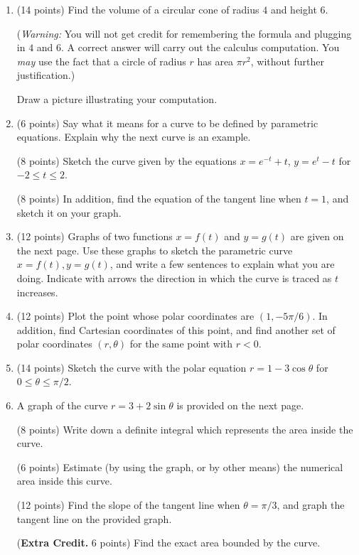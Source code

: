 \documentclass[12pt]{article}
\begin{document}
\begin{enumerate}[(1)]
\item
(14 points) Find the volume of a circular cone of radius $4$ and height $6$.

({\itshape Warning:} You will not get credit for remembering the formula
and plugging in $4$ and $6$. A correct answer will carry out the calculus
computation. You {\itshape may} use the fact that a circle of radius $r$ has
area $\pi r^2$, without further justification.)

Draw a picture illustrating your computation.

\item
(6 points) Say what it means for a curve to be defined by parametric equations. Explain why the next curve
is an example.

(8 points) Sketch the curve given by the equations $x = e^{-t} + t$, $y = e^t - t$ for $-2 \leq t \leq 2$.

(8 points) In addition, find the equation of the tangent line when $t = 1$, and sketch it on your graph.

\item
(12 points) Graphs of two functions $x = f(t)$ and $y = g(t)$ are given on the next page. Use these graphs to sketch
the parametric curve $x = f(t), y = g(t)$, and write a few sentences to explain what you
are doing. 
Indicate with arrows
the direction in which the curve is traced as $t$ increases.
\item
(12 points) Plot the point whose polar coordinates are $(1, -5 \pi/6)$. In addition, find Cartesian
coordinates of this point, and find another set of polar coordinates $(r, \theta)$ for the
same point with $r < 0$.
\item
(14 points) Sketch the curve with the polar equation $r = 1 - 3 \cos \theta$ for $0 \leq \theta \leq \pi/2$.

\item
A graph of the curve $r = 3 + 2 \sin \theta$ is provided on the next page.

(8 points) Write down a definite integral which represents the area inside the curve. 

(6 points) Estimate (by using the graph, or by other means) the numerical area inside this curve.

(12 points) Find the slope of the tangent line when $\theta = \pi/3$, and graph the tangent line on the provided
graph.

({\bf Extra Credit.} 6 points) Find the exact area bounded by the curve.

\end{enumerate}
\end{document}
